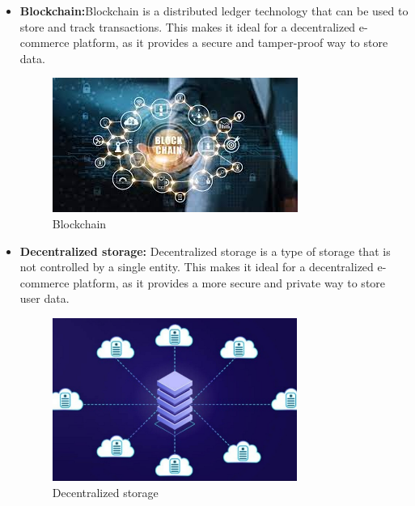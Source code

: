 \documentclass{report}
\begin{document}
\begin{itemize}
    \item \textbf{Blockchain:}Blockchain is a distributed ledger technology that can be used to store and track transactions. This makes it ideal for a decentralized e-commerce platform, as it provides a secure and tamper-proof way to store data.
    \begin{figure}[H]
        \centering
        \includegraphics{tools/blockchain.jpeg}
        \caption{Blockchain}
        \label{fig:enter-label}
    \end{figure}

    \item \textbf{Decentralized storage: }Decentralized storage is a type of storage that is not controlled by a single entity. This makes it ideal for a decentralized e-commerce platform, as it provides a more secure and private way to store user data.
    \begin{figure}[H]
        \centering
        \includegraphics[width=8cm]{tools/decentralizestorge.jpg}
        \caption{Decentralized storage}
        \label{fig:enter-label}
    \end{figure}


\end{itemize}
\end{document}
